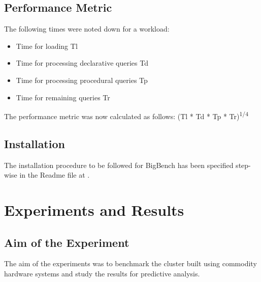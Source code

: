 \documentclass[12pt]{book}
\begin{document}
\section{Performance Metric}
The following times were noted down for a workload:
\begin{itemize}
 \item Time for loading Tl
 \item Time for processing declarative queries Td
 \item Time for processing procedural queries Tp
 \item Time for remaining queries Tr
\end{itemize}
The performance metric was now calculated as follows:
\newline
(Tl * Td * Tp * Tr)\textsuperscript{1/4}

\section{Installation}
The installation procedure to be followed for BigBench has been specified step-wise in the Readme file at \cite{bigbenchgit}.


\chapter{Experiments and Results}
\section{Aim of the Experiment}
The aim of the experiments was to benchmark the cluster built using commodity hardware systems and study the results for predictive analysis. 
\end{document}
